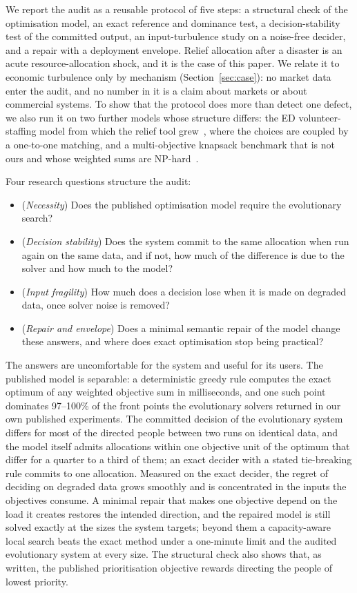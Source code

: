 \documentclass[systems,article,submit,moreauthors,pdftex]{Definitions/mdpi}
\begin{document}
We report the audit as a reusable protocol of five steps: a structural check of the
optimisation model, an exact reference and dominance test, a decision-stability test of the
committed output, an input-turbulence study on a noise-free decider, and a repair with a
deployment envelope. Relief allocation after a disaster is an acute resource-allocation shock,
and it is the case of this paper. We relate it to economic turbulence only by mechanism
(Section~\ref{sec:case}): no market data enter the audit, and no number in it is a claim about
markets or about commercial systems. To show that the protocol does more than detect one
defect, we also run it on two further models whose structure differs: the ED volunteer-staffing
model from which the relief tool grew~\cite{rabiei2023volunteer}, where the choices are coupled
by a one-to-one matching, and a multi-objective knapsack benchmark that is not ours and whose
weighted sums are NP-hard~\cite{zitzler1999spea}.

Four research questions structure the audit:
\begin{itemize}
\item[RQ1] (\emph{Necessity}) Does the published optimisation model require the evolutionary
search?
\item[RQ2] (\emph{Decision stability}) Does the system commit to the same allocation when run
again on the same data, and if not, how much of the difference is due to the solver and how
much to the model?
\item[RQ3] (\emph{Input fragility}) How much does a decision lose when it is made on degraded
data, once solver noise is removed?
\item[RQ4] (\emph{Repair and envelope}) Does a minimal semantic repair of the model change
these answers, and where does exact optimisation stop being practical?
\end{itemize}

The answers are uncomfortable for the system and useful for its users. The published model
is separable: a deterministic greedy rule computes the exact optimum of any weighted
objective sum in milliseconds, and one such point dominates 97--100\% of the front points the
evolutionary solvers returned in our own published experiments. The committed decision of the
evolutionary system differs for most of the directed people between two runs on identical
data, and the model itself admits allocations within one objective unit of the optimum that
differ for a quarter to a third of them; an exact decider with a stated tie-breaking rule
commits to one allocation. Measured on the exact decider, the regret of deciding on degraded
data grows smoothly and is concentrated in the inputs the objectives consume. A minimal repair
that makes one objective depend on the load it creates restores the intended direction, and
the repaired model is still solved exactly at the sizes the system targets; beyond them a
capacity-aware local search beats the exact method under a one-minute limit and the audited
evolutionary system at every size. The structural check also shows that, as written, the published
prioritisation objective rewards directing the people of lowest priority.
\end{document}
